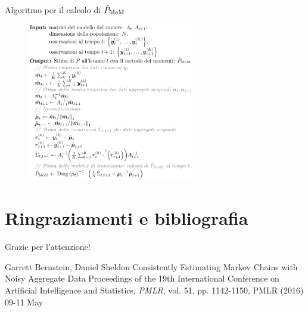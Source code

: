 \documentclass[10pt,xcolor={table,dvipsnames}]{beamer} 		%
\theoremstyle{plain}					%
\theoremstyle{definition}
\theoremstyle{remark}
\begin{document}
	\begin{frame}[fragile]
		{Algoritmo per il calcolo di $\hat{P}_{\textup{MoM}}$}

		\begin{figure}[ht]
			\centering
			\includegraphics[width=0.65\textwidth]{Immagini/algorithm_nonstationary.png}
		\end{figure}
		
	\end{frame}











	

    
\section{Ringraziamenti e bibliografia}
    \begin{frame}
        \begin{center}
            \Huge{Grazie per l'attenzione!}
        \end{center}
    \end{frame}

	\begin{frame}{\refname}
		\begin{thebibliography}{9}
			 Garrett Bernstein, Daniel Sheldon
			\newblock Consistently Estimating Markov Chains with Noisy Aggregate Data
			\newblock Proceedings of the 19th International Conference on Artificial Intelligence and Statistics, \emph{PMLR}, vol. 51, pp. 1142-1150, PMLR (2016) 09-11 May

		\end{thebibliography}
	\end{frame}
\end{document}
